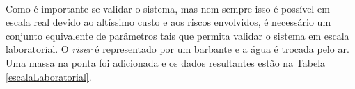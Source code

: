 \paragraph{}Como é importante se validar o sistema, mas nem sempre isso é possível em escala real devido ao altíssimo custo e aos riscos envolvidos, é necessário um conjunto equivalente de parâmetros tais que permita validar o sistema em escala laboratorial. O \textit{riser} é representado por um barbante e a água é trocada pelo ar. Uma massa na ponta foi adicionada e os dados resultantes estão na Tabela \ref{escalaLaboratorial}.

